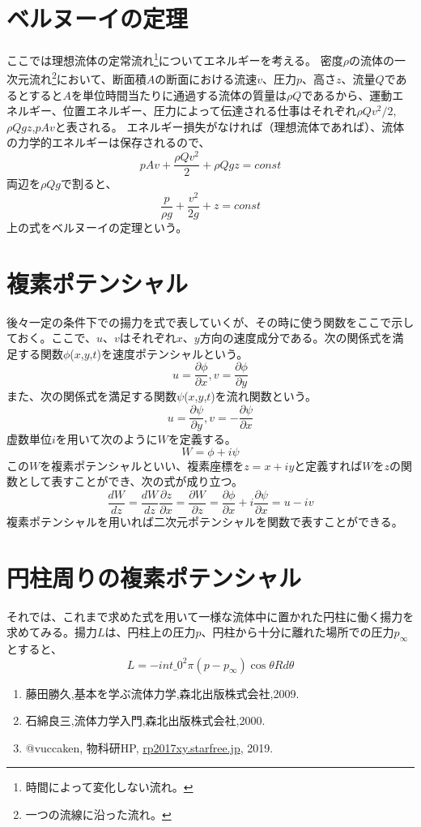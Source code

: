 \documentclass[10pt,b5paper,papersize,dvipdfmx]{jsbook}
\begin{document}
\section{ベルヌーイの定理}
ここでは理想流体の定常流れ\footnote{時間によって変化しない流れ。}についてエネルギーを考える。
密度$\rho$の流体の一次元流れ\footnote{一つの流線に沿った流れ。}において、断面積$A$の断面における流速$v$、圧力$p$、高さ$z$、流量$Q$であるとすると$A$を単位時間当たりに通過する流体の質量は$\rho$$Q$であるから、運動エネルギー、位置エネルギー、圧力によって伝達される仕事はそれぞれ$\rho$$Qv^2/2$,$\rho Qgz$,$pAv$と表される。
エネルギー損失がなければ（理想流体であれば）、流体の力学的エネルギーは保存されるので、
\begin{equation}
pAv+\frac{\rho Qv^2}{2}+\rho Qgz=const
\end{equation}
両辺を$\rho Qg$で割ると、
\begin{equation}
\frac{p}{\rho g}+\frac{v^2}{2g}+z=const
\end{equation}
上の式をベルヌーイの定理という。
\par
\section{複素ポテンシャル}
後々一定の条件下での揚力を式で表していくが、その時に使う関数をここで示しておく。ここで、$u$、$v$はそれぞれ$x$、$y$方向の速度成分である。次の関係式を満足する関数$\phi$($x$,$y$,$t$)を速度ポテンシャルという。
\begin{equation}
u=\frac{\partial\phi}{\partial x}, v=\frac{\partial\phi}{\partial y}
\end{equation}
また、次の関係式を満足する関数$\psi$($x$,$y$,$t$)を流れ関数という。
\begin{equation}
u=\frac{\partial\psi}{\partial y}, v=-\frac{\partial\psi}{\partial x}
\end{equation}
虚数単位$i$を用いて次のように$W$を定義する。
\begin{equation}
W=\phi+i\psi
\end{equation}
この$W$を複素ポテンシャルといい、複素座標を$z=x+iy$と定義すれば$W$を$z$の関数として表すことができ、次の式が成り立つ。
\begin{equation}
\frac{dW}{dz}=\frac{dW}{dz}\frac{\partial z}{\partial x}=\frac{\partial W}{\partial z}=\frac{\partial\phi}{\partial x}+i\frac{\partial\psi}{\partial x}=u-iv
\end{equation}
複素ポテンシャルを用いれば二次元ポテンシャルを関数で表すことができる。
\section{円柱周りの複素ポテンシャル}
それでは、これまで求めた式を用いて一様な流体中に置かれた円柱に働く揚力を求めてみる。揚力$L$は、円柱上の圧力$p$、円柱から十分に離れた場所での圧力$p_\infty$とすると、
\begin{equation}
L=-int\_0^2\pi(p-p_\infty)\cos\theta Rd\theta
\end{equation}




\begin{sanko}
  \begin{enumerate}
    \item 藤田勝久,基本を学ぶ流体力学,森北出版株式会社,2009.
    \item 石綿良三,流体力学入門,森北出版株式会社,2000.
    \item @vuccaken, 物科研HP, \url{rp2017xy.starfree.jp}, 2019.
  \end{enumerate}
\end{sanko}
\end{document}
